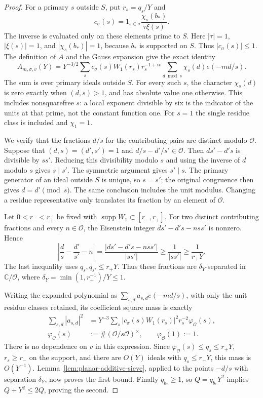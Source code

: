 \documentclass[11pt,a4paper]{article}
\numberwithin{equation}{section}
\numberwithin{figure}{section}
\theoremstyle{definition}
\theoremstyle{remark}
\begin{document}
\begin{proof}
For a primary $s$ outside $S$, put $r_s=q_s/Y$ and
\[
 c_\sigma(s)=1_{s\in\sigma}\frac{\chi_s(b_*)}{\tau\xi(s)}.
\]
The inverse is evaluated only on these elements prime to $S$.  Here $|\tau|=1$,
$|\xi(s)|=1$, and $|\chi_s(b_*)|=1$, because $b_*$ is supported on $S$.
Thus $|c_\sigma(s)|\le1$.  The definition of $A$ and the Gauss expansion
give the exact identity
\[
 A_{m,\sigma,v}(Y)
 =Y^{-3/2}\sum_s c_\sigma(s)W_1(r_s)r_s^{-1+iv}
       \sum_{d\bmod s}\chi_s(d)e(-md/s).
\]
The sum is over primary ideals outside $S$.  For every such $s$, the
character $\chi_s(d)$ is zero exactly when $(d,s)>1$, and has absolute value
one otherwise.  This includes nonsquarefree $s$: a local exponent divisible
by six is the indicator of the units at that prime, not the constant
function one.  For $s=1$ the single residue class is included and
$\chi_1=1$.

We verify that the fractions $d/s$ for the contributing pairs are distinct
modulo $\mathcal O$.  Suppose that $(d,s)=(d',s')=1$ and
$d/s-d'/s'\in\mathcal O$.  Then $ds'-d's$ is divisible by $ss'$.
Reducing this divisibility modulo $s$ and using the inverse of $d$ modulo
$s$ gives $s\mid s'$.  The symmetric argument gives $s'\mid s$.
The primary generator of an ideal outside $S$ is unique, so $s=s'$;
the original congruence then gives $d=d'\pmod s$.  The same conclusion
includes the unit modulus.  Changing a residue representative only
translates its fraction by an element of $\mathcal O$.

Let $0<r_-<r_+$ be fixed with $\operatorname{supp}W_1\subset[r_-,r_+]$.
For two distinct contributing fractions and every $n\in\mathcal O$,
the Eisenstein integer $ds'-d's-nss'$ is nonzero.  Hence
\[
 \left|\frac d s-\frac{d'}{s'}-n\right|
 =\frac{|ds'-d's-nss'|}{|ss'|}
 \ge\frac1{|ss'|}\ge\frac1{r_+Y}.
\]
The last inequality uses $q_s,q_{s'}\le r_+Y$.  Thus these fractions are
$\delta_Y$-separated in $\mathbb C/\mathcal O$, where
$\delta_Y=\min(1,r_+^{-1})/Y\le1$.

Writing the expanded polynomial as
$\sum_{s,d}a_{s,d}e(-md/s)$, with only the unit residue classes retained,
its coefficient square mass is exactly
\[
 \begin{split}
 \sum_{s,d}|a_{s,d}|^2
 &=Y^{-3}\sum_s |c_\sigma(s)W_1(r_s)|^2r_s^{-2}
       \varphi_{\mathcal O}(s),\\
 \varphi_{\mathcal O}(s)
 &:=\#(\mathcal O/s\mathcal O)^\times,\qquad
 \varphi_{\mathcal O}(1):=1.
 \end{split}
\]
There is no dependence on $v$ in this expression.  Since
$\varphi_{\mathcal O}(s)\le q_s\le r_+Y$, $r_s\ge r_-$ on the support,
and there are $O(Y)$ ideals with $q_s\le r_+Y$, this mass is $O(Y^{-1})$.
Lemma~\ref{lem:planar-additive-sieve}, applied to the points $-d/s$ with
separation $\delta_Y$, now proves the first bound.  Finally $q_{b_*}\ge1$,
so $Q=q_{b_*}Y^2$ implies $Q+Y^2\le2Q$, proving the second.
\end{proof}
\end{document}
